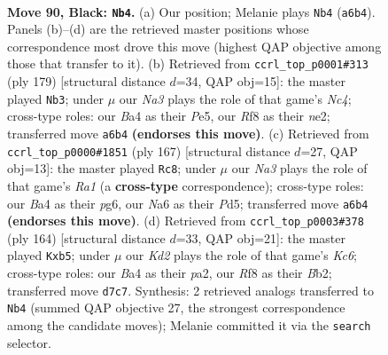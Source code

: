 \documentclass[11pt]{article}
\begin{document}
\clearpage

\begin{figure}[p]\centering
\begin{subfigure}{0.46\textwidth}\centering
\resizebox{\linewidth}{!}{%
\newchessgame
\chessboard[
  setfen={5r2/3k1p2/n5p1/4P2p/b4Pp1/3B4/3N1K1P/8 b - - 39 90},
  showmover=false,
  pgfstyle=straightmove, color=movearrow, markmove={a6-b4}
]}
\caption{}
\end{subfigure}\hfill
\begin{subfigure}{0.46\textwidth}\centering
\resizebox{\linewidth}{!}{%
\newchessgame
\chessboard[
  setfen={8/5k2/p1p2p2/Ppn1pP1K/4P3/4B3/4N3/8 b - - 1 90},
  showmover=false,
  pgfstyle=straightmove, color=movearrow, markmove={c5-b3}
]}
\caption{}
\end{subfigure}
\\[4pt]
\begin{subfigure}{0.46\textwidth}\centering
\resizebox{\linewidth}{!}{%
\newchessgame
\chessboard[
  setfen={r7/4k3/2B1p1P1/3p1p2/3P4/3NP3/6K1/8 b - - 9 84},
  showmover=false,
  pgfstyle=straightmove, color=movearrow, markmove={a8-c8}
]}
\caption{}
\end{subfigure}\hfill
\begin{subfigure}{0.46\textwidth}\centering
\resizebox{\linewidth}{!}{%
\newchessgame
\chessboard[
  setfen={8/5k2/2K5/1p1pP3/1PpP2P1/2P2b2/pB6/8 w - - 5 83},
  showmover=false,
  pgfstyle=straightmove, color=movearrow, markmove={c6-b5}
]}
\caption{}
\end{subfigure}
\caption{\textbf{Move 90, Black: \texttt{Nb4}.} (a) Our position; Melanie plays \texttt{Nb4} (\texttt{a6b4}). Panels (b)--(d) are the retrieved master positions whose correspondence most drove this move (highest QAP objective among those that transfer to it). (b) Retrieved from \texttt{ccrl\_top\_p0001\#313} (ply 179) [structural distance $d$=34, QAP obj=15]: the master played \texttt{Nb3}; under $\mu$ our \emph{Na3} plays the role of that game's \emph{Nc4}; cross-type roles: our \emph{B}a4 as their \emph{P}e5, our \emph{R}f8 as their \emph{n}e2; transferred move \texttt{a6b4} \textbf{(endorses this move)}. (c) Retrieved from \texttt{ccrl\_top\_p0000\#1851} (ply 167) [structural distance $d$=27, QAP obj=13]: the master played \texttt{Rc8}; under $\mu$ our \emph{Na3} plays the role of that game's \emph{Ra1} (a \textbf{cross-type} correspondence); cross-type roles: our \emph{B}a4 as their \emph{p}g6, our \emph{N}a6 as their \emph{P}d5; transferred move \texttt{a6b4} \textbf{(endorses this move)}. (d) Retrieved from \texttt{ccrl\_top\_p0003\#378} (ply 164) [structural distance $d$=33, QAP obj=21]: the master played \texttt{Kxb5}; under $\mu$ our \emph{Kd2} plays the role of that game's \emph{Kc6}; cross-type roles: our \emph{B}a4 as their \emph{p}a2, our \emph{R}f8 as their \emph{B}b2; transferred move \texttt{d7c7}. Synthesis: 2 retrieved analogs transferred to \texttt{Nb4} (summed QAP objective 27, the strongest correspondence among the candidate moves); Melanie committed it via the \texttt{search} selector.}
\label{fig:thought-m179}
\end{figure}
\end{document}
